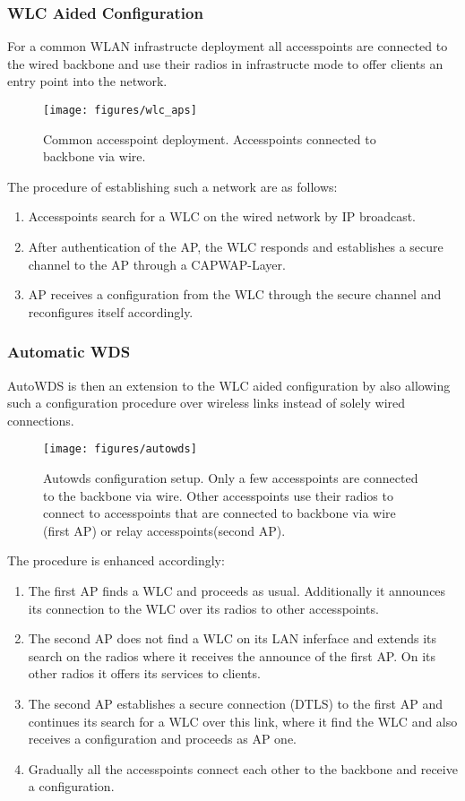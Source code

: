       \subsubsection{WLC Aided Configuration}
	For a common WLAN infrastructe deployment all accesspoints are connected to the wired backbone and use their radios in infrastructe mode to 
	offer clients an entry point into the network.
	\begin{figure}[h!]
	  \centering
	  \texttt{[image: figures/wlc\_aps]}
	  \caption{Common accesspoint deployment. Accesspoints connected to backbone via wire.}
	  \label{fig:wlc_aps}
	\end{figure}
	The procedure of establishing such a network are as follows:
	\begin{enumerate}
	 \item Accesspoints search for a \ac{WLC} on the wired network by IP broadcast.
	 \item After authentication of the \ac{AP}, the \ac{WLC} responds and establishes a secure channel to the \ac{AP} through a \ac{CAPWAP}-Layer.
	 \item \ac{AP} receives a configuration from the \ac{WLC} through the secure channel and reconfigures itself accordingly.
	\end{enumerate}
	
      \subsubsection{Automatic \ac{WDS}}
      AutoWDS is then an extension to the WLC aided configuration by also allowing such a configuration procedure over wireless links instead of solely wired connections.
            
      \begin{figure}[h!]
	  \centering
	  \texttt{[image: figures/autowds]}
	  \caption{Autowds configuration setup. Only a few accesspoints are connected to the backbone via wire. 
	  Other accesspoints use their radios to connect to accesspoints that are connected to backbone via wire (first \ac{AP}) or relay accesspoints(second \ac{AP}).}
	  \label{fig:autowds}
      \end{figure}
      The procedure is enhanced accordingly:
      \begin{enumerate}
       \item The first \ac{AP} finds a WLC and proceeds as usual. Additionally it announces its connection to the WLC over its radios to other accesspoints.
       \item The second \ac{AP} does not find a \ac{WLC} on its LAN inferface and extends its search on the radios where it receives the announce of the first \ac{AP}.
	On its other radios it offers its services to clients.
       \item The second \ac{AP} establishes a secure connection (\ac{DTLS}) to the first \ac{AP} and continues its search for a \ac{WLC} over this link, 
	where it find the \ac{WLC} and also receives a configuration and proceeds as \ac{AP} one.
	\item Gradually all the accesspoints connect each other to the backbone and receive a configuration.
      \end{enumerate}

